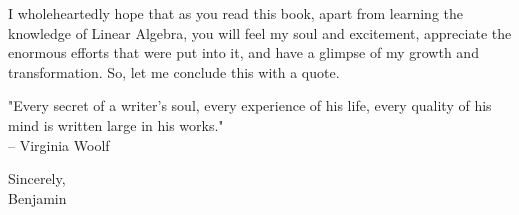 I wholeheartedly hope that as you read this book, apart from learning the knowledge of Linear Algebra, you will feel my soul and excitement, appreciate the enormous efforts that were put into it, and have a glimpse of my growth and transformation. So, let me conclude this with a quote.

\begin{center}
\large
"Every secret of a writer's soul, every experience of his life, every quality of his mind is written large in his works."\\
-- Virginia Woolf
\end{center}

{\raggedleft Sincerely,\\
Benjamin \par}

\tableofcontents